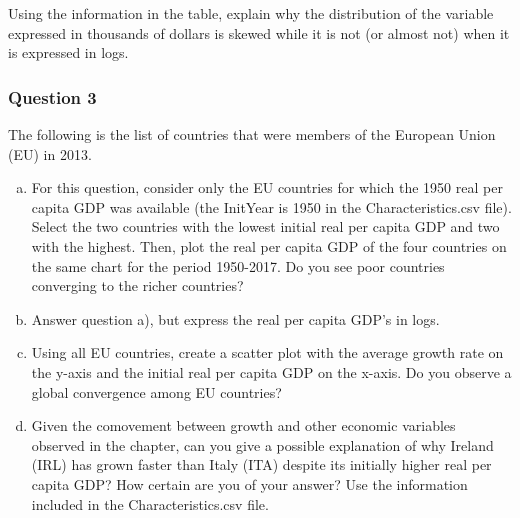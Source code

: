 \documentclass[letterpaper]{article}\usepackage[]{graphicx}\usepackage[]{color}
\numberwithin{exer}{section}
\theoremstyle{nonumberplain}
\begin{document}
\begin{enumerate}[a)]
\begin{center}
{}
\end{center}  
\end{enumerate}
Using the information in the table, explain why the distribution of
the variable expressed in thousands of dollars is skewed while it is
not (or almost not) when it is expressed in logs.

\subsubsection*{Question 3}
The following is the list of countries that were members of the
European Union (EU) in 2013.
\begin{center}
\end{center}

\begin{enumerate}[a)]
  \item For this question, consider only the EU countries for which
    the 1950 real per capita GDP was available (the InitYear is 1950
    in the Characteristics.csv file). Select the two countries with
    the lowest initial real per capita GDP and two with the
    highest. Then, plot the real per capita GDP of the four countries
    on the same chart for the period 1950-2017. Do you see poor
    countries converging to the richer countries?
  \item Answer question a), but express the real per capita GDP's in
    logs.
  \item Using all EU countries, create a scatter plot with the average
    growth rate on the y-axis and the initial real per capita GDP on
    the x-axis. Do you observe a global convergence among EU
    countries?
  \item Given the comovement between growth and other economic
    variables observed in the chapter, can you give a possible
    explanation of why Ireland (IRL) has grown faster than Italy (ITA)
    despite its initially higher real per capita GDP? How certain are
    you of your answer? Use the information included in the
    Characteristics.csv file.
\end{enumerate}
\end{document}
